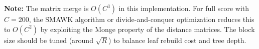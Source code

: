 \documentclass[11pt,a4paper]{article}
\begin{document}
\textbf{Note:} The matrix merge is $O(C^3)$ in this implementation. For full score with $C = 200$, the SMAWK algorithm or divide-and-conquer optimization reduces this to $O(C^2)$ by exploiting the Monge property of the distance matrices. The block size should be tuned (around $\sqrt{R}$) to balance leaf rebuild cost and tree depth.
\end{document}
